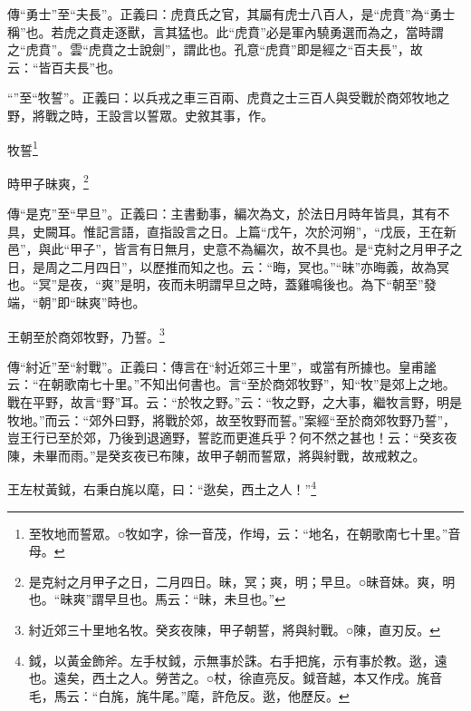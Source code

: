 {\noindent\zhuan{}\fzbyks 傳“勇士”至“夫長”。正義曰：虎賁氏之官，其屬有虎士八百人，是“虎賁”為“勇士稱”也。若虎之賁走逐獸，言其猛也。此“虎賁”必是軍內驍勇選而為之，當時謂之“虎賁”。雲“虎賁之士說劍”，謂此也。孔意“虎賁”即是經之“百夫長”，故云：“皆百夫長”也。 \par}

{\noindent\shu{}\fzkt “”至“牧誓”。正義曰：以兵戎之車三百兩、虎賁之士三百人與受戰於商郊牧地之野，將戰之時，王設言以誓眾。史敘其事，作。 \par}

牧誓\footnote{至牧地而誓眾。○牧如字，徐一音茂，作坶，云：“地名，在朝歌南七十里。”音母。}

時甲子昧爽，\footnote{是克紂之月甲子之日，二月四日。昧，冥；爽，明；早旦。○昧音妹。爽，明也。“昧爽”謂早旦也。馬云：“昧，未旦也。”}

{\noindent\zhuan{}\fzbyks 傳“是克”至“早旦”。正義曰：主書動事，編次為文，於法日月時年皆具，其有不具，史闕耳。惟記言語，直指設言之日。上篇“戊午，次於河朔”，“戊辰，王在新邑”，與此“甲子”，皆言有日無月，史意不為編次，故不具也。是“克紂之月甲子之日，是周之二月四日”，以歷推而知之也。云：“晦，冥也。”“昧”亦晦義，故為冥也。“冥”是夜，“爽”是明，夜而未明謂早旦之時，蓋雞鳴後也。為下“朝至”發端，“朝”即“昧爽”時也。 \par}

王朝至於商郊牧野，乃誓。\footnote{紂近郊三十里地名牧。癸亥夜陳，甲子朝誓，將與紂戰。○陳，直刃反。}

{\noindent\zhuan{}\fzbyks 傳“紂近”至“紂戰”。正義曰：傳言在“紂近郊三十里”，或當有所據也。皇甫謐云：“在朝歌南七十里。”不知出何書也。言“至於商郊牧野”，知“牧”是郊上之地。戰在平野，故言“野”耳。云：“於牧之野。”云：“牧之野，之大事，繼牧言野，明是牧地。”而云：“郊外曰野，將戰於郊，故至牧野而誓。”案經“至於商郊牧野乃誓”，豈王行已至於郊，乃後到退適野，誓訖而更進兵乎？何不然之甚也！云：“癸亥夜陳，未畢而雨。”是癸亥夜已布陳，故甲子朝而誓眾，將與紂戰，故戒敕之。 \par}

王左杖黃鉞，右秉白旄以麾，曰：“逖矣，西土之人！”\footnote{鉞，以黃金飾斧。左手杖鉞，示無事於誅。右手把旄，示有事於教。逖，遠也。遠矣，西土之人。勞苦之。○杖，徐直亮反。鉞音越，本又作戌。旄音毛，馬云：“白旄，旄牛尾。”麾，許危反。逖，他歷反。}

